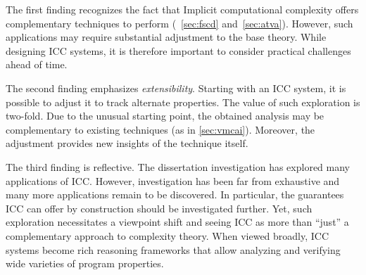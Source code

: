 The first finding recognizes the fact that Implicit computational complexity
offers complementary techniques to perform 
(\cf~\autoref{sec:fscd} and~\autoref{sec:atva}). However, such applications may
require substantial adjustment to the base theory. While designing ICC systems,
it is therefore important to consider practical challenges ahead of time.

The second finding emphasizes \emph{extensibility}. Starting with an ICC system,
it is possible to adjust it to track alternate properties. The value of such
exploration is two-fold. Due to the unusual starting point, the obtained
analysis may be complementary to existing techniques (as in
\autoref{sec:vmcai}). Moreover, the adjustment provides new insights of the
technique itself.

The third finding is reflective. The dissertation investigation has explored
many applications of ICC\@. However, investigation has been far from exhaustive
and many more applications remain to be discovered. In particular, the
guarantees ICC can offer by construction should be investigated further. Yet,
such exploration necessitates a viewpoint shift and seeing ICC as more than
\enquote{just} a complementary approach to complexity theory. When viewed
broadly, ICC systems become rich reasoning frameworks that allow analyzing and
verifying wide varieties of program properties.

